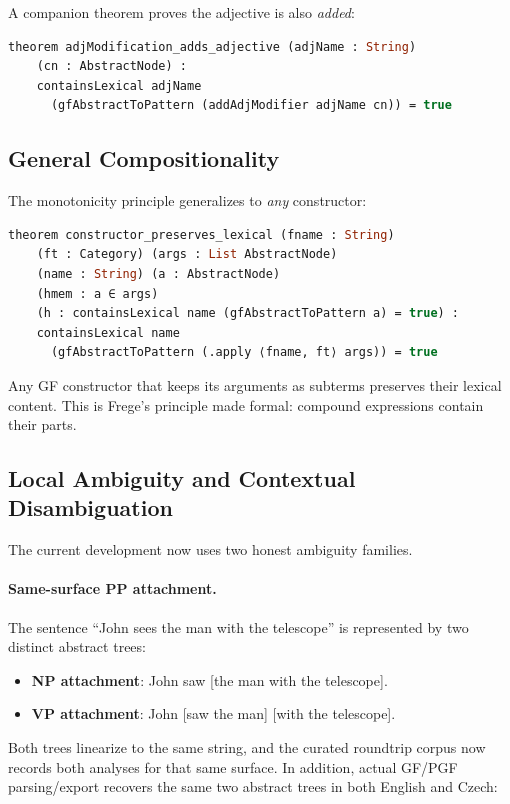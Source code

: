 \documentclass[11pt]{article}
\newcommand{\GF}{\textup{GF}}
\begin{document}
A companion theorem proves the adjective is also \emph{added}:

\begin{lstlisting}[language=ml]
theorem adjModification_adds_adjective (adjName : String)
    (cn : AbstractNode) :
    containsLexical adjName
      (gfAbstractToPattern (addAdjModifier adjName cn)) = true
\end{lstlisting}

\subsection{General Compositionality}

The monotonicity principle generalizes to \emph{any} constructor:

\begin{lstlisting}[language=ml,caption={General compositionality}]
theorem constructor_preserves_lexical (fname : String)
    (ft : Category) (args : List AbstractNode)
    (name : String) (a : AbstractNode)
    (hmem : a ∈ args)
    (h : containsLexical name (gfAbstractToPattern a) = true) :
    containsLexical name
      (gfAbstractToPattern (.apply ⟨fname, ft⟩ args)) = true
\end{lstlisting}

Any \GF{} constructor that keeps its arguments as subterms preserves
their lexical content.  This is Frege's principle made formal: compound
expressions contain their parts.

\subsection{Local Ambiguity and Contextual Disambiguation}

The current development now uses two honest ambiguity families.

\paragraph{Same-surface PP attachment.}
The sentence ``John sees the man with the telescope'' is represented by two
distinct abstract trees:
\begin{itemize}
\item \textbf{NP attachment}: John saw [the man with the telescope].
\item \textbf{VP attachment}: John [saw the man] [with the telescope].
\end{itemize}
Both trees linearize to the same string, and the curated roundtrip corpus now
records both analyses for that same surface.  In addition, actual \GF{}/PGF
parsing/export recovers the same two abstract trees in both English and Czech:
\end{document}
